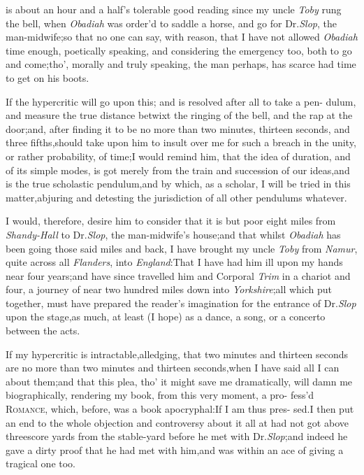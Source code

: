 \documentclass{article}
\begin{document}
 is about an hour and a
half’s tole\-rable good reading since my uncle \textit{Toby} rung
the bell, when \textit{Obadiah} was\break
order’d to saddle a horse, and go for\break 
Dr.\@ \textit{Slop}, the man-midwife;\tsk so that no one can say,
with reason, that I have not allowed \textit{Obadiah} time enough,
poetically speaking, and considering the emergency too, both to go
and come;\tsh tho’,\break
morally and truly speaking, the man\break
perhaps, has scarce had time to get on\break
his boots.

If the hypercritic will go upon this; and is resolved after all
to take a pen- dulum, and measure the true distance betwixt the
ringing of the bell, and the rap at the door;\tsk and, after
finding it to be no more than two minutes, thirteen seconds, and
three fifths,\tsk should take upon him to insult over me for such
a breach in the unity, or rather probability, of time;\tsk I would
remind him, that the idea of duration, and of its simple modes, is
got merely from the train and succession of our
ideas,\tsk and is the true scholastic
pendulum,\tsh and by which, as a scholar, I will be tried
in this matter,\tsk\break abjuring and detesting the jurisdiction of
all other pendulums whatever.

I would, therefore, desire him to consider that it is but poor
eight miles from \textit{Shandy-Hall} to Dr.\@ \textit{Slop}, the
man-mid\-wife’s house;\tsk and that whilst \textit{Obadiah} has
been going those said miles and back,
I have brought my uncle
\textit{Toby} from \textit{Namur}, quite across all \textit{Flanders}, into
\textit{England}:\tsk That I have had him ill upon my hands near
four years;\tsk and have since travelled him and Corporal
\textit{Trim} in a chariot and four, a journey of near two hundred
miles down into \textit{Yorkshire};\tsk all which put together,
must have prepared the reader’s imagination for the entrance
of Dr.\@ \textit{Slop} upon the stage,\tsk as much, at least (I hope)
as a dance, a song, or a concerto between the acts.

If my hypercritic is intractable,\tsk al\-ledging, that two minutes
and thirteen seconds are no more than two minutes and thirteen
seconds,\tsk when I have said all I can about them;\tsk and that this
plea, tho’ it might save me dramatically, will damn me
biographically, rendering my book, from this very moment, a
pro-
fess’d \textsc{Romance}, which, before, was a book
apocryphal:\tsk If I am thus pres-\break
sed.\tsk I then put an
end to the whole objection and controversy about it all
at\break
{}
had not got above threescore yards from the stable-yard before he met
with Dr.\@ \textit{Slop};\tsk and indeed he gave a dirty
proof that he had met with him,\tsk and was within an ace of giving a
tragical one\break
too.  
\end{document}
